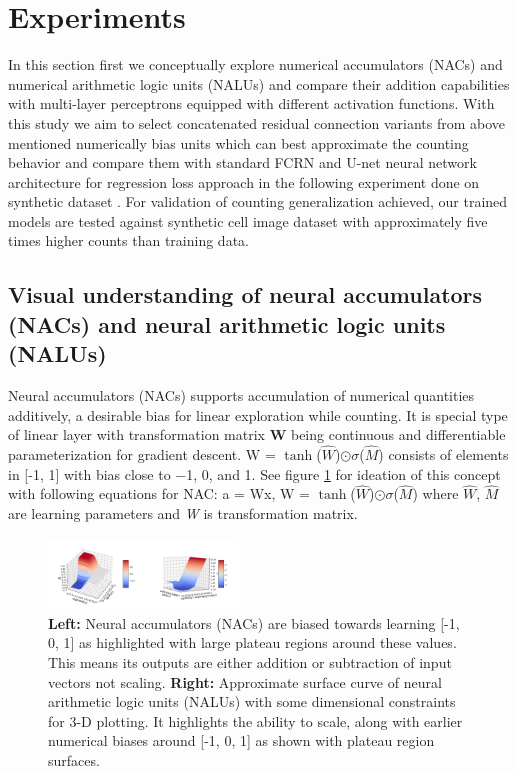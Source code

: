 \documentclass[conference]{IEEEtran}
\begin{document}
\section{Experiments}

In this section first we conceptually explore numerical accumulators (NACs) and numerical arithmetic logic units (NALUs) and compare their addition capabilities with multi-layer perceptrons equipped with different activation functions. With this study we aim to select concatenated residual connection variants from above mentioned numerically bias units which can best approximate the counting behavior and compare them with standard FCRN and U-net neural network architecture for regression loss approach in the following experiment done on synthetic dataset \cite{b28}. For validation of counting generalization achieved, our trained models are tested against synthetic cell image dataset with approximately five times higher counts than training data.

\subsection{Visual understanding of neural accumulators (NACs) and neural arithmetic logic units (NALUs)}

Neural accumulators (NACs) \cite{b5} supports accumulation of numerical quantities additively, a desirable bias for linear exploration while counting. It is special type of linear layer with transformation matrix \textbf{W} being continuous and differentiable parameterization for gradient descent. W = $\tanh$($\hat{W}$)$\odot$$\sigma$($\hat{M}$)  consists of elements in [-1, 1] with bias close to  −1, 0, and 1. See figure \ref{fig3} for ideation of this concept with following equations for NAC:  a = Wx, W = $\tanh$($\hat{W}$)$\odot$$\sigma$($\hat{M}$) where \textit{$\hat{W}$}, \textit{$\hat{M}$} are learning parameters and \textit{W} is transformation matrix.

\begin{figure}[!h]
\centering
\includegraphics[width=0.45\textwidth]{assets/nac-nalu.png}
\caption{
\textbf{Left:} Neural accumulators (NACs) are biased towards learning [-1, 0, 1] as highlighted with large plateau regions around these values. This means its outputs are either addition or subtraction of input vectors not scaling.
\textbf{Right:} Approximate surface curve of neural arithmetic logic units (NALUs) with some dimensional constraints for 3-D plotting. It highlights the ability to scale, along with earlier numerical biases around [-1, 0, 1] as shown with plateau region surfaces.}
\label{fig3}
\end{figure}
\end{document}
